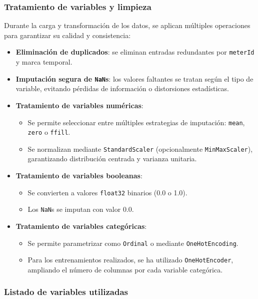 \subsubsection*{Tratamiento de variables y limpieza}

Durante la carga y transformación de los datos, se aplican múltiples operaciones para garantizar su calidad y consistencia:

\begin{itemize}
	\item \textbf{Eliminación de duplicados}: se eliminan entradas redundantes por \texttt{meterId} y marca temporal.
	\item \textbf{Imputación segura de \texttt{NaN}s}: los valores faltantes se tratan según el tipo de variable, evitando pérdidas de información o distorsiones estadísticas.
	\item \textbf{Tratamiento de variables numéricas}:
	\begin{itemize}
		\item Se permite seleccionar entre múltiples estrategias de imputación: \texttt{mean}, \texttt{zero} o \texttt{ffill}.
		\item Se normalizan mediante \texttt{StandardScaler} (opcionalmente \texttt{MinMaxScaler}), garantizando distribución centrada y varianza unitaria.
	\end{itemize}
	\item \textbf{Tratamiento de variables booleanas}:
	\begin{itemize}
		\item Se convierten a valores \texttt{float32} binarios (0.0 o 1.0).
		\item Los \texttt{NaN}s se imputan con valor 0.0.
	\end{itemize}
	\item \textbf{Tratamiento de variables categóricas}:
	\begin{itemize}
		\item Se permite parametrizar como \texttt{Ordinal} o mediante \texttt{OneHotEncoding}.
		\item Para los entrenamientos realizados, se ha utilizado \texttt{OneHotEncoder}, ampliando el número de columnas por cada variable categórica.
	\end{itemize}
\end{itemize}

\subsubsection*{Listado de variables utilizadas}


